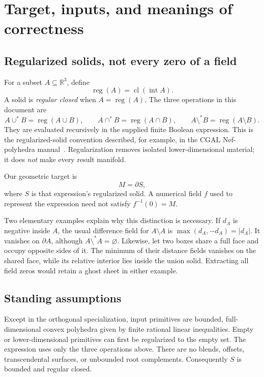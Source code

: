 \documentclass[11pt]{article}
\theoremstyle{definition}
\theoremstyle{remark}
\newcommand{\R}{\mathbb R}
\newcommand{\cl}{\operatorname{cl}}
\newcommand{\intr}{\operatorname{int}}
\newcommand{\reg}{\operatorname{reg}}
\begin{document}
\tableofcontents

\section{Target, inputs, and meanings of correctness}
\label{sec:target}

\subsection{Regularized solids, not every zero of a field}

For a subset $A\subseteq\R^3$, define
\[
  \reg(A)=\cl(\intr A).
\]
A solid is \emph{regular closed} when $A=\reg(A)$. The three operations in
this document are
\[
  A\mathbin{\cup^*}B=\reg(A\cup B),\qquad
  A\mathbin{\cap^*}B=\reg(A\cap B),\qquad
  A\mathbin{\setminus^*}B=\reg(A\setminus B).
\]
They are evaluated recursively in the supplied finite Boolean expression.
This is the regularized-solid convention described, for example, in the CGAL
Nef-polyhedra manual~\cite{cgal-nef}. Regularization removes isolated
lower-dimensional material; it does \emph{not} make every result manifold.

Our geometric target is
\[
  M=\partial S,
\]
where $S$ is that expression's regularized solid. A numerical field $f$ used
to represent the expression need not satisfy $f^{-1}(0)=M$.

Two elementary examples explain why this distinction is necessary.
If $d_A$ is negative inside $A$, the usual difference field for $A\setminus A$
is $\max(d_A,-d_A)=|d_A|$. It vanishes on $\partial A$, although
$A\setminus^* A=\varnothing$. Likewise, let two boxes share a full face and
occupy opposite sides of it. The minimum of their distance fields vanishes
on the shared face, while its relative interior lies inside the union solid.
Extracting all field zeros would retain a ghost sheet in either example.

\subsection{Standing assumptions}

Except in the orthogonal specialization, input primitives are bounded,
full-dimensional convex polyhedra given by finite rational linear
inequalities. Empty or lower-dimensional primitives can first be regularized
to the empty set. The expression uses only the three operations above.
There are no blends, offsets, transcendental surfaces, or unbounded root
complements. Consequently $S$ is bounded and regular closed.
\end{document}
